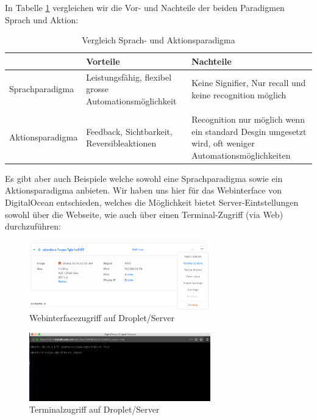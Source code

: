 \graphicspath{ {../images/} } 

In Tabelle \ref{table:1} vergleichen wir die Vor- und Nachteile der beiden Paradigmen Sprach und Aktion:
\begin{table}[h!]
\centering
  \begin{tabular}{||p{3cm}|p{5cm}|p{5cm}||} 
 \hline
 & Vorteile & Nachteile \\ [0.5ex] 
 \hline\hline
 Sprachparadigma & Leistungsfähig, flexibel grosse Automationsmöglichkeit &
    Keine Signifier, Nur recall und keine recognition möglich \\ [1.5ex] 
    & & \\
 Aktionsparadigma & Feedback, Sichtbarkeit, Reversibleaktionen & Recognition nur
  möglich wenn ein standard Desgin umgesetzt wird, oft weniger
  Automationsmöglichkeiten \\
 \hline
\end{tabular}
\caption{Vergleich Sprach- und Aktionsparadigma}
\label{table:1}
\end{table}

Es gibt aber auch Beispiele welche sowohl eine Sprachparadigma sowie ein
Aktionsparadigma anbieten. Wir haben uns hier für das Webinterface von
DigitalOcean entschieden, welches die Möglichkeit bietet Server-Eintstellungen
sowohl über die Webseite, wie auch über einen Terminal-Zugriff (via Web)
durchzuführen:




\begin{figure}[h]
  \caption{Webinterfacezugriff auf Droplet/Server}
  \centering
  \includegraphics[width=0.7\textwidth]{digitalocean1}
\end{figure}


\begin{figure}[h]
  \caption{Terminalzugriff auf Droplet/Server}
  \centering
  \includegraphics[width=0.7\textwidth]{digitalocean2}
\end{figure}

